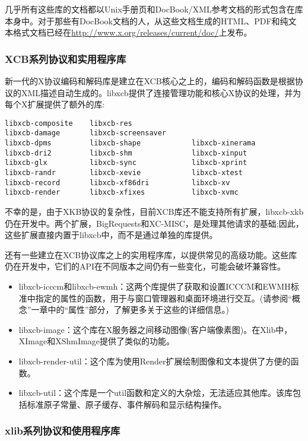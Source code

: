 几乎所有这些库的文档都以Unix手册页和DocBook/XML参考文档的形式包含在库本身中。对于那些有DocBook文档的人，从这些文档生成的HTML、PDF和纯文本格式文档已经在\url{http://www.x.org/releases/current/doc/}上发布。

\subsubsection{XCB系列协议和实用程序库}

新一代的X协议编码和解码库是建立在XCB核心之上的，编码和解码函数是根据协议的XML描述自动生成的。libxcb提供了连接管理功能和核心X协议的处理，并为每个X扩展提供了额外的库:

\begin{lstlisting}
libxcb-composite    libxcb-res        
libxcb-damage       libxcb-screensaver 
libxcb-dpms         libxcb-shape            libxcb-xinerama
libxcb-dri2         libxcb-shm              libxcb-xinput
libxcb-glx          libxcb-sync         	libxcb-xprint
libxcb-randr        libxcb-xevie            libxcb-xtest
libxcb-record       libxcb-xf86dri      	libxcb-xv
libxcb-render       libxcb-xfixes       	libxcb-xvmc
\end{lstlisting}

不幸的是，由于XKB协议的复杂性，目前XCB库还不能支持所有扩展，libxcb-xkb仍在开发中。两个扩展，BigRequests和XC-MISC，是处理其他请求的基础;因此，这些扩展直接内置于libxcb中，而不是通过单独的库提供。

还有一些建立在XCB协议库之上的实用程序库，以提供常见的高级功能。这些库仍在开发中，它们的API在不同版本之间仍有一些变化，可能会破坏兼容性。

\begin{itemize}
	\item libxcb-icccm和libxcb-ewmh：这两个库提供了获取和设置ICCCM和EWMH标准中指定的属性的函数，用于与窗口管理器和桌面环境进行交互。(请参阅“概念”一章中的“属性”部分，了解更多关于这些的详细信息。)
	\item libxcb-image：这个库在X服务器之间移动图像(客户端像素图)。在Xlib中，XImage和XShmImage提供了类似的功能。
	\item libxcb-render-util：这个库为使用Render扩展绘制图像和文本提供了方便的函数。
	\item libxcb-util：这个库是一个util函数和定义的大杂烩，无法适应其他库。该库包括标准原子常量、原子缓存、事件解码和显示结构操作。
\end{itemize}

\subsubsection{xlib系列协议和使用程序库}

